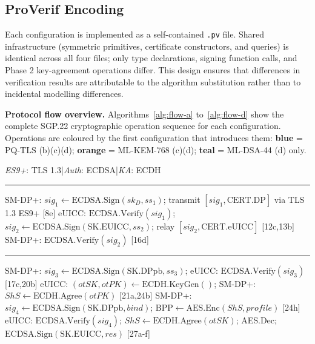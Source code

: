 \documentclass[a4paper,fleqn]{cas-sc}
\begin{document}
\subsection{ProVerif Encoding}
\label{sec:fv-encoding}

Each configuration is implemented as a self-contained \texttt{.pv} file.
Shared infrastructure (symmetric primitives, certificate constructors,
and queries) is identical across all four files; only type declarations,
signing function calls, and Phase 2 key-agreement operations differ.
This design ensures that differences in verification results are
attributable to the algorithm substitution rather than to incidental
modelling differences.

\noindent\textbf{Protocol flow overview.}
Algorithms~\ref{alg:flow-a} to~\ref{alg:flow-d} show the complete SGP.22 cryptographic
operation sequence for each configuration. Operations are coloured by the first
configuration that introduces them: \textcolor{cfgB}{\textbf{blue}} = PQ-TLS
(b)(c)(d); \textcolor{cfgC}{\textbf{orange}} = ML-KEM-768 (c)(d);
\textcolor{cfgD}{\textbf{teal}} = ML-DSA-44 (d) only.

\begin{algorithm}[H]
\caption{Config (a): Classical baseline: ECDSA + ECDH + TLS 1.3}
\label{alg:flow-a}
\footnotesize
\begin{algorithmic}[1]
\Statex \textit{ES9+}: TLS 1.3\enspace|\enspace\textit{Auth}: ECDSA\enspace|\enspace\textit{KA}: ECDH
\Statex \rule{0.95\linewidth}{0.2pt}
\State SM-DP+: $\mathit{sig}_1\gets\text{ECDSA.Sign}(\mathit{sk}_D,\mathit{ss}_1)$; transmit $[\mathit{sig}_1,\mathrm{CERT.DP}]$ via TLS 1.3 ES9+ {\color{gray}[8e]}
\State eUICC: $\text{ECDSA.Verify}(\mathit{sig}_1)$; $\mathit{sig}_2\gets\text{ECDSA.Sign}(\mathrm{SK.EUICC},\mathit{ss}_2)$; relay $[\mathit{sig}_2,\mathrm{CERT.eUICC}]$ {\color{gray}[12c,13b]}
\State SM-DP+: $\text{ECDSA.Verify}(\mathit{sig}_2)$ {\color{gray}[16d]}
\Statex \rule{0.95\linewidth}{0.2pt}
\State SM-DP+: $\mathit{sig}_3\gets\text{ECDSA.Sign}(\mathrm{SK.DPpb},\mathit{ss}_3)$; eUICC: $\text{ECDSA.Verify}(\mathit{sig}_3)$ {\color{gray}[17c,20b]}
\State eUICC: $(\mathit{otSK},\mathit{otPK})\gets\text{ECDH.KeyGen}()$; SM-DP+: $\mathit{ShS}\gets\text{ECDH.Agree}(\mathit{otPK})$ {\color{gray}[21a,24b]}
\State SM-DP+: $\mathit{sig}_4\gets\text{ECDSA.Sign}(\mathrm{SK.DPpb},\mathit{bind})$; $\mathrm{BPP}\gets\text{AES.Enc}(\mathit{ShS},\mathit{profile})$ {\color{gray}[24h]}
\State eUICC: $\text{ECDSA.Verify}(\mathit{sig}_4)$; $\mathit{ShS}\gets\text{ECDH.Agree}(\mathit{otSK})$; AES.Dec; $\text{ECDSA.Sign}(\mathrm{SK.EUICC},\mathit{res})$ {\color{gray}[27a-f]}
\end{algorithmic}
\end{algorithm}
\end{document}
